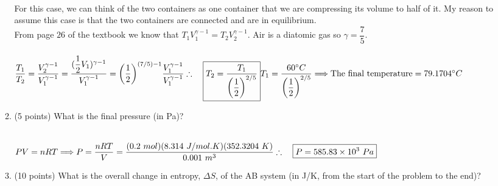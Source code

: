 \documentclass[fleqn]{article}
\begin{document}
\begin{enumerate}
\begin{enumerate}
        \textcolor{hwColor}{
          \\
          For this case, we can think of the two containers as one container that we are compressing 
          its volume to half of it. My reason to assume this case is that the two containers 
          are connected and are in equilibrium.
          \\
          From page $26$ of the textbook we know that $T_1 V^{\gamma-1}_1=T_2 V^{\gamma-1}_2$. Air is a diatomic 
          gas so $\gamma=\dfrac{7}{5}$.
          \\
          \\
          $
            \dfrac{T_1}{T_2}=\dfrac{V^{\gamma-1}_2}{V^{\gamma-1}_1}
            =\dfrac{(\dfrac{1}{2} V_1)^{\gamma-1}}{V^{\gamma-1}_1}
            =\bigg( \dfrac{1}{2} \bigg)^{(7/5)-1} \dfrac{V^{\gamma-1}_1}{V^{\gamma-1}_1}
            \\
            \\
            \\
            \therefore ~~~ \boxed{
              T_2=\dfrac{T_1}{\bigg( \dfrac{1}{2} \bigg)^{2/5}}
            }
            \\
            \\
            \\
            T_1=\dfrac{60^{\circ} C}{\bigg( \dfrac{1}{2} \bigg)^{2/5}}
            \Longrightarrow
            \text{The final temperature}=79.1704^{\circ} C
            \\
          $
        }


      \item (5 points) What is the final pressure (in Pa)?

        \textcolor{hwColor}{
          \\
          $
            PV=nRT \Longrightarrow 
            P=\dfrac{nRT}{V}
            =\dfrac{(0.2 ~ mol)(8.314 ~ J/mol.K)(352.3204 ~ K)}{0.001 ~ m^3}
            \\
            \\
            \\
            \therefore ~~~ \boxed{
              P=585.83 \times 10^3 ~ Pa
            }
            \\
          $
        }

      \pagebreak

      \item (10 points) What is the overall change in entropy, $\Delta S$, of the AB system (in J/K, from the
      start of the problem to the end)?


\end{enumerate}
\end{enumerate}
\end{document}
